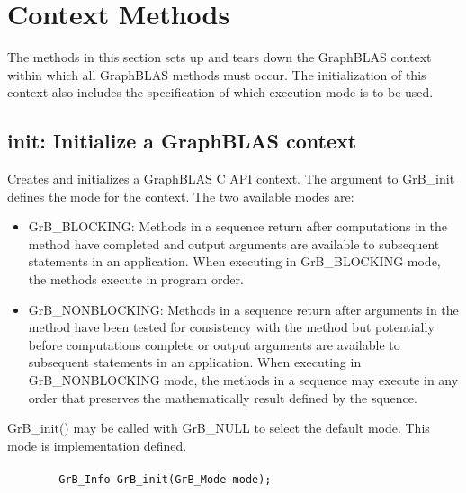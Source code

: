 \section{Context Methods}

The methods in this section sets up and tears down the GraphBLAS
context within which all GraphBLAS methods must occur.  The initialization
of this context also includes the specification of which execution mode is
to be used.

\subsection{{\sf init}: Initialize a GraphBLAS context}

Creates and initializes a GraphBLAS C API context.  The argument
to {\sf GrB\_init} defines the mode for the context.  The two
available modes are:

\begin{itemize}
\item {\sf GrB\_BLOCKING}: Methods in a sequence return after
computations in the method have completed and output arguments
are available to subsequent statements in an application.  When
executing in {\sf GrB\_BLOCKING} mode, the methods execute 
in program order.

\item {\sf GrB\_NONBLOCKING}: Methods in a sequence return after
arguments in the method have been tested for consistency with the
method but potentially before computations complete or output 
arguments are available to subsequent statements in an application.
When executing in {\sf GrB\_NONBLOCKING} mode, the methods 
in a sequence may execute in any order that preserves the 
mathematically result defined by the squence.

\end{itemize}

{\sf GrB\_init()} may be called with {\sf GrB\_NULL} to select 
the default mode.  This mode is implementation defined.

\paragraph{\syntax}

\begin{verbatim}
        GrB_Info GrB_init(GrB_Mode mode);
\end{verbatim}


